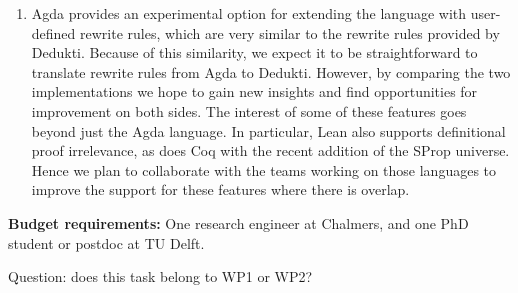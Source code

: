 \begin{enumerate}
\item Agda provides an experimental option for extending the language
with user-defined rewrite rules, which are very similar to the rewrite
rules provided by Dedukti. Because of this similarity, we expect it to
be straightforward to translate rewrite rules from Agda to
Dedukti. However, by comparing the two implementations we hope to gain
new insights and find opportunities for improvement on both sides. The
interest of some of these features goes beyond just the Agda
language. In particular, Lean also supports definitional proof
irrelevance, as does Coq with the recent addition of the SProp
universe. Hence we plan to collaborate with the teams working on those
languages to improve the support for these features where there is
overlap.
\end{enumerate}

\textbf{Budget requirements:} One research engineer at Chalmers, and one PhD student or postdoc at TU Delft.

Question: does this task belong to WP1 or WP2?


